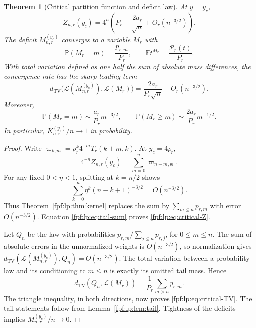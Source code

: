 \documentclass[11pt]{article}
\numberwithin{equation}{section}
\newtheorem{theorem}{Theorem}[section]
\theoremstyle{definition}
\newcommand{\E}{\mathbb E}
\newcommand{\Prob}{\mathbb P}
\newcommand{\Law}{\mathcal L}
\newcommand{\TV}{d_{\mathrm{TV}}}
\begin{document}
\begin{theorem}[Critical partition function and deficit law]
\label{fpf:lp:thm:critical}
At \(y=y_c\),
\begin{equation}\label{fpf:lp:eq:critical-Z}
 Z_{n,r}(y_c)=4^n\left(P_r-\frac{2a_r}{\sqrt n}
                                  +O_r(n^{-3/2})\right).
\end{equation}
The deficit \(M_{n,r}^{(y_c)}\) converges to a variable \(M_r\) with
\begin{equation}\label{fpf:lp:eq:critical-law}
 \Prob(M_r=m)=\frac{p_{r,m}}{P_r},\qquad
 \E t^{M_r}=\frac{\mathcal P_r(t)}{P_r}.
\end{equation}
With total variation defined as one half the sum of absolute mass
differences, the convergence rate has the sharp leading term
\begin{equation}\label{fpf:lp:eq:critical-TV}
 \TV\bigl(\Law(M_{n,r}^{(y_c)}),\Law(M_r)\bigr)
 =\frac{2a_r}{P_r\sqrt n}+O_r(n^{-3/2}).
\end{equation}
Moreover,
\begin{equation}\label{fpf:lp:eq:prob-tail}
 \Prob(M_r=m)\sim\frac{a_r}{P_r}m^{-3/2},\qquad
 \Prob(M_r\ge m)\sim\frac{2a_r}{P_r}m^{-1/2}.
\end{equation}
In particular, \(K_{n,r}^{(y_c)}/n\to1\) in probability.
\end{theorem}
\begin{proof}
Write \(\varpi_{k,m}=\rho_r^k4^{-m}T_r(k+m,k)\). At \(y_c=4\rho_r\),
\[
 4^{-n}Z_{n,r}(y_c)=\sum_{m=0}^n\varpi_{n-m,m}.
\]
For any fixed \(0<\eta<1\), splitting at \(k=n/2\) shows
\begin{equation}\label{fpf:lp:eq:error-sum}
 \sum_{k=0}^n\eta^k(n-k+1)^{-3/2}=O(n^{-3/2}).
\end{equation}
Thus Theorem~\ref{fpf:lp:thm:kernel} replaces the sum by
\(\sum_{m\le n}p_{r,m}\) with error \(O(n^{-3/2})\). Equation
\eqref{fpf:lp:eq:tail-sum} proves \eqref{fpf:lp:eq:critical-Z}.

Let \(Q_n\) be the law with probabilities
\(p_{r,m}/\sum_{j\le n}p_{r,j}\), for \(0\le m\le n\).
The sum of absolute errors in the unnormalized weights is
\(O(n^{-3/2})\), so normalization gives
\(\TV(\Law(M_{n,r}^{(y_c)}),Q_n)=O(n^{-3/2})\).
The total variation between a probability law and its conditioning to
\(m\le n\) is exactly its omitted tail mass. Hence
\[
 \TV(Q_n,\Law(M_r))=\frac1{P_r}\sum_{m>n}p_{r,m}.
\]
The triangle inequality, in both directions, now proves
\eqref{fpf:lp:eq:critical-TV}. The tail statements follow from
Lemma~\ref{fpf:lp:lem:tail}. Tightness of the deficits implies
\(M_{n,r}^{(y_c)}/n\to0\).
\end{proof}
\end{document}
